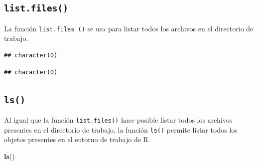\documentclass[]{book}
\newenvironment{Shaded}{\begin{snugshade}}{\end{snugshade}}
\newcommand{\KeywordTok}[1]{\textcolor[rgb]{0.13,0.29,0.53}{\textbf{#1}}}
\newcommand{\DataTypeTok}[1]{\textcolor[rgb]{0.13,0.29,0.53}{#1}}
\newcommand{\StringTok}[1]{\textcolor[rgb]{0.31,0.60,0.02}{#1}}
\newcommand{\CommentTok}[1]{\textcolor[rgb]{0.56,0.35,0.01}{\textit{#1}}}
\newcommand{\NormalTok}[1]{#1}
\begin{document}
\subsection{\texorpdfstring{\texttt{list.files()}}{list.files()}}\label{l015listfiles}

La función \texttt{list.files\ ()} se usa para listar todos los archivos
en el directorio de trabajo.

\begin{Shaded}
\end{Shaded}

\begin{verbatim}
## character(0)
\end{verbatim}

\begin{Shaded}
\end{Shaded}

\begin{verbatim}
## character(0)
\end{verbatim}

\subsection{\texorpdfstring{\texttt{ls()}}{ls()}}\label{l015ls}

Al igual que la función \texttt{list.files()} hace posible listar todos
los archivos presentes en el directorio de trabajo, la función
\texttt{ls()} permite listar todos los objetos presentes en el entorno
de trabajo de R.

\begin{Shaded}
\begin{Highlighting}[]
\KeywordTok{ls}\NormalTok{()}
\end{Highlighting}
\end{Shaded}
\end{document}
